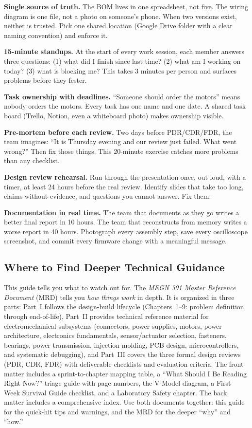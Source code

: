 \documentclass[11pt,letterpaper]{article}
\begin{document}
\textbf{Single source of truth.} The BOM lives in one spreadsheet, not five. The wiring diagram is one file, not a photo on someone's phone. When two versions exist, neither is trusted. Pick one shared location (Google Drive folder with a clear naming convention) and enforce it.

\textbf{15-minute standups.} At the start of every work session, each member answers three questions: (1) what did I finish since last time? (2) what am I working on today? (3) what is blocking me? This takes 3 minutes per person and surfaces problems before they fester.

\textbf{Task ownership with deadlines.} ``Someone should order the motors'' means nobody orders the motors. Every task has one name and one date. A shared task board (Trello, Notion, even a whiteboard photo) makes ownership visible.

\textbf{Pre-mortem before each review.} Two days before PDR/CDR/FDR, the team imagines: ``It is Thursday evening and our review just failed. What went wrong?'' Then fix those things. This 20-minute exercise catches more problems than any checklist.

\textbf{Design review rehearsal.} Run through the presentation once, out loud, with a timer, at least 24 hours before the real review. Identify slides that take too long, claims without evidence, and questions you cannot answer. Fix them.

\textbf{Documentation in real time.} The team that documents as they go writes a better final report in 10 hours. The team that reconstructs from memory writes a worse report in 40 hours. Photograph every assembly step, save every oscilloscope screenshot, and commit every firmware change with a meaningful message.

\subsection{Where to Find Deeper Technical Guidance}

This guide tells you what to watch out for. The \textit{MEGN 301 Master Reference Document} (MRD) tells you \textit{how things work} in depth. It is organized in three parts: Part~I follows the design-build lifecycle (Chapters~1--9: problem definition through end-of-life), Part~II provides technical reference material for electromechanical subsystems (connectors, power supplies, motors, power architecture, electronics fundamentals, sensor/actuator selection, fasteners, bearings, power transmission, injection molding, PCB design, microcontrollers, and systematic debugging), and Part~III covers the three formal design reviews (PDR, CDR, FDR) with deliverable checklists and evaluation criteria. The front matter includes a sprint-to-chapter mapping table, a ``What Should I Be Reading Right Now?'' triage guide with page numbers, the V-Model diagram, a First Week Survival Guide checklist, and a Laboratory Safety chapter. The back matter includes a comprehensive index. Use both documents together: this guide for the quick-hit tips and warnings, and the MRD for the deeper ``why'' and ``how.''
\end{document}
